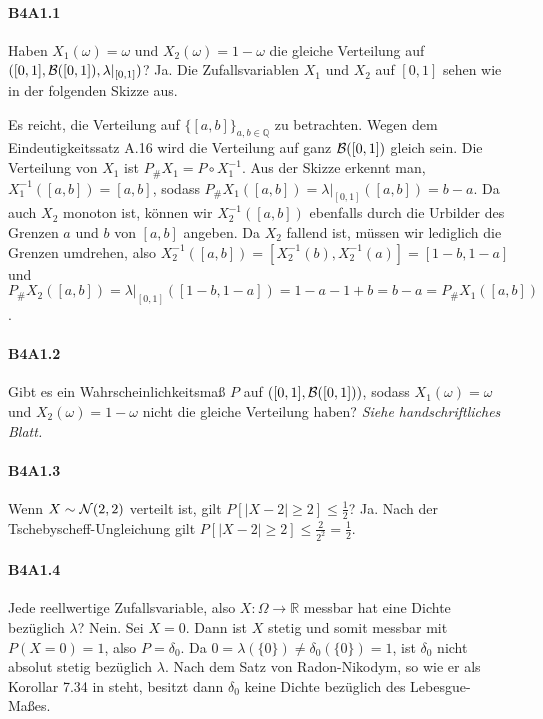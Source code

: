 \documentclass{article}
\begin{document}
\paragraph{B4A1.1}
Haben $X_1(\omega)=\omega$ und $X_2(\omega)=1-\omega$ die gleiche Verteilung auf $([0,1],{\cal B}([0,1]),\lambda|_{[0,1]})$?
Ja.
Die Zufallsvariablen $X_1$ und $X_2$ auf $[0,1]$ sehen wie in der folgenden Skizze aus.
\begin{center}
\end{center}
Es reicht, die Verteilung auf $\{[a,b]\}_{a,b\in\mathbb{Q}}$ zu betrachten.
Wegen dem Eindeutigkeitssatz A.16 wird die Verteilung auf ganz ${\cal B}([0,1])$ gleich sein.
Die Verteilung von $X_1$ ist $P_\#X_1=P\circ X_1^{-1}$.
Aus der Skizze erkennt man, $X_1^{-1}([a,b])=[a,b]$, sodass $P_\#X_1([a,b])=\lambda|_{[0,1]}([a,b])=b-a$.
Da auch $X_2$ monoton ist, können wir $X_2^{-1}([a,b])$ ebenfalls durch die Urbilder des Grenzen $a$ und $b$ von $[a,b]$ angeben.
Da $X_2$ fallend ist, müssen wir lediglich die Grenzen umdrehen, also $X_2^{-1}([a,b])=[X_2^{-1}(b),X_2^{-1}(a)]=[1-b,1-a]$ und $P_\#X_2([a,b])=\lambda|_{[0,1]}([1-b,1-a])=1-a-1+b=b-a=P_\#X_1([a,b])$.
\paragraph{B4A1.2}
Gibt es ein Wahrscheinlichkeitsmaß $P$ auf $([0,1],{\cal B}([0,1]))$, sodass $X_1(\omega)=\omega$ und $X_2(\omega)=1-\omega$ nicht die gleiche Verteilung haben? \emph{Siehe handschriftliches Blatt.}
\paragraph{B4A1.3}
Wenn $X\sim{\cal N}(2,2)$ verteilt ist, gilt $P[|X-2|\geq2]\leq\frac{1}{2}$?
Ja.
Nach der Tschebyscheff-Ungleichung gilt $P[|X-2|\geq2]\leq\frac{2}{2^2}=\frac{1}{2}$.
\paragraph{B4A1.4}
Jede reellwertige Zufallsvariable, also $X\colon \Omega\to\mathbb{R}$ messbar hat eine Dichte bezüglich $\lambda$?
Nein.
Sei $X=0$.
Dann ist $X$ stetig und somit messbar mit $P(X=0)=1$, also $P=\delta_0$.
Da $0=\lambda(\{0\})\neq\delta_0(\{0\})=1$, ist $\delta_0$ nicht absolut stetig bezüglich $\lambda$.
Nach dem Satz von Radon-Nikodym, so wie er als Korollar 7.34 in \cite{klenke} steht, besitzt dann $\delta_0$ keine Dichte bezüglich des Lebesgue-Maßes.
\end{document}
